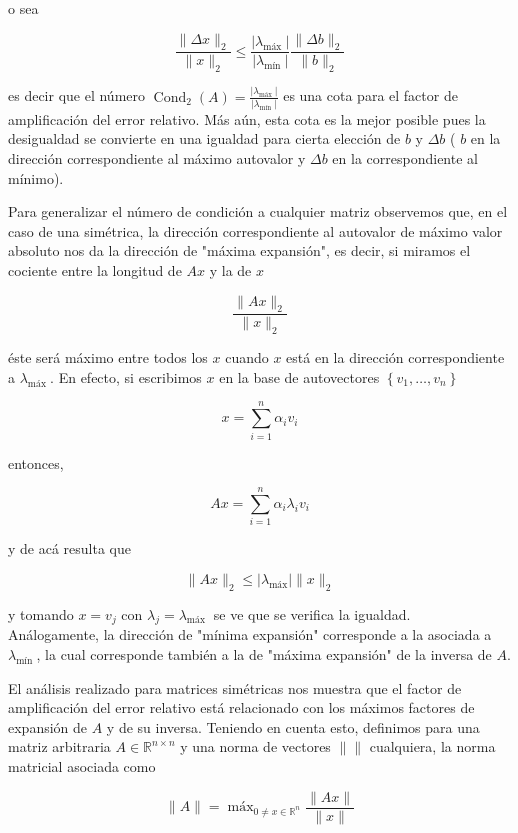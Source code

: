 \documentclass[10pt]{book}
\begin{document}
o sea

$$
\frac{\|\Delta x\|_{2}}{\|x\|_{2}} \leq \frac{\left|\lambda_{\text {máx }}\right|}{\left|\lambda_{\text {mín }}\right|} \frac{\|\Delta b\|_{2}}{\|b\|_{2}}
$$

es decir que el número $\operatorname{Cond}_{2}(A)=\frac{\left|\lambda_{\text {máx }}\right|}{\left|\lambda_{\text {mín }}\right|}$ es una cota para el factor de amplificación del error relativo. Más aún, esta cota es la mejor posible pues la desigualdad se convierte en una igualdad para cierta elección de $b$ y $\Delta b$ ( $b$ en la dirección correspondiente al máximo autovalor y $\Delta b$ en la correspondiente al mínimo).

Para generalizar el número de condición a cualquier matriz observemos que, en el caso de una simétrica, la dirección correspondiente al autovalor de máximo valor absoluto nos da la dirección de "máxima expansión", es decir, si miramos el cociente entre la longitud de $A x$ y la de $x$

$$
\frac{\|A x\|_{2}}{\|x\|_{2}}
$$

éste será máximo entre todos los $x$ cuando $x$ está en la dirección correspondiente a $\lambda_{\text {máx }}$. En efecto, si escribimos $x$ en la base de autovectores $\left\{v_{1}, \ldots, v_{n}\right\}$

$$
x=\sum_{i=1}^{n} \alpha_{i} v_{i}
$$

entonces,

$$
A x=\sum_{i=1}^{n} \alpha_{i} \lambda_{i} v_{i}
$$

y de acá resulta que

$$
\|A x\|_{2} \leq\left|\lambda_{\operatorname{máx}}\right|\|x\|_{2}
$$

y tomando $x=v_{j}$ con $\lambda_{j}=\lambda_{\text {máx }}$ se ve que se verifica la igualdad.\\
Análogamente, la dirección de "mínima expansión" corresponde a la asociada a $\lambda_{\text {mín }}$, la cual corresponde también a la de "máxima expansión" de la inversa de $A$.

El análisis realizado para matrices simétricas nos muestra que el factor de amplificación del error relativo está relacionado con los máximos factores de expansión de $A$ y de su inversa. Teniendo en cuenta esto, definimos para una matriz arbitraria $A \in \mathbb{R}^{n \times n}$ y una norma de vectores $\|\|$ cualquiera, la norma matricial asociada como

$$
\|A\|=\operatorname{máx}_{0 \neq x \in \mathbb{R}^{n}} \frac{\|A x\|}{\|x\|}
$$
\end{document}
